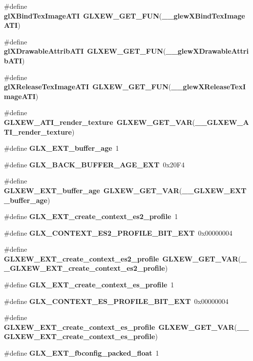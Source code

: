 \begin{DoxyCompactItemize}
\item 
\#define {\bf gl\+X\+Bind\+Tex\+Image\+A\+TI}~{\bf G\+L\+X\+E\+W\+\_\+\+G\+E\+T\+\_\+\+F\+UN}({\bf \+\_\+\+\_\+glew\+X\+Bind\+Tex\+Image\+A\+TI})
\item 
\#define {\bf gl\+X\+Drawable\+Attrib\+A\+TI}~{\bf G\+L\+X\+E\+W\+\_\+\+G\+E\+T\+\_\+\+F\+UN}({\bf \+\_\+\+\_\+glew\+X\+Drawable\+Attrib\+A\+TI})
\item 
\#define {\bf gl\+X\+Release\+Tex\+Image\+A\+TI}~{\bf G\+L\+X\+E\+W\+\_\+\+G\+E\+T\+\_\+\+F\+UN}({\bf \+\_\+\+\_\+glew\+X\+Release\+Tex\+Image\+A\+TI})
\item 
\#define {\bf G\+L\+X\+E\+W\+\_\+\+A\+T\+I\+\_\+render\+\_\+texture}~{\bf G\+L\+X\+E\+W\+\_\+\+G\+E\+T\+\_\+\+V\+AR}({\bf \+\_\+\+\_\+\+G\+L\+X\+E\+W\+\_\+\+A\+T\+I\+\_\+render\+\_\+texture})
\item 
\#define {\bf G\+L\+X\+\_\+\+E\+X\+T\+\_\+buffer\+\_\+age}~1
\item 
\#define {\bf G\+L\+X\+\_\+\+B\+A\+C\+K\+\_\+\+B\+U\+F\+F\+E\+R\+\_\+\+A\+G\+E\+\_\+\+E\+XT}~0x20\+F4
\item 
\#define {\bf G\+L\+X\+E\+W\+\_\+\+E\+X\+T\+\_\+buffer\+\_\+age}~{\bf G\+L\+X\+E\+W\+\_\+\+G\+E\+T\+\_\+\+V\+AR}({\bf \+\_\+\+\_\+\+G\+L\+X\+E\+W\+\_\+\+E\+X\+T\+\_\+buffer\+\_\+age})
\item 
\#define {\bf G\+L\+X\+\_\+\+E\+X\+T\+\_\+create\+\_\+context\+\_\+es2\+\_\+profile}~1
\item 
\#define {\bf G\+L\+X\+\_\+\+C\+O\+N\+T\+E\+X\+T\+\_\+\+E\+S2\+\_\+\+P\+R\+O\+F\+I\+L\+E\+\_\+\+B\+I\+T\+\_\+\+E\+XT}~0x00000004
\item 
\#define {\bf G\+L\+X\+E\+W\+\_\+\+E\+X\+T\+\_\+create\+\_\+context\+\_\+es2\+\_\+profile}~{\bf G\+L\+X\+E\+W\+\_\+\+G\+E\+T\+\_\+\+V\+AR}({\bf \+\_\+\+\_\+\+G\+L\+X\+E\+W\+\_\+\+E\+X\+T\+\_\+create\+\_\+context\+\_\+es2\+\_\+profile})
\item 
\#define {\bf G\+L\+X\+\_\+\+E\+X\+T\+\_\+create\+\_\+context\+\_\+es\+\_\+profile}~1
\item 
\#define {\bf G\+L\+X\+\_\+\+C\+O\+N\+T\+E\+X\+T\+\_\+\+E\+S\+\_\+\+P\+R\+O\+F\+I\+L\+E\+\_\+\+B\+I\+T\+\_\+\+E\+XT}~0x00000004
\item 
\#define {\bf G\+L\+X\+E\+W\+\_\+\+E\+X\+T\+\_\+create\+\_\+context\+\_\+es\+\_\+profile}~{\bf G\+L\+X\+E\+W\+\_\+\+G\+E\+T\+\_\+\+V\+AR}({\bf \+\_\+\+\_\+\+G\+L\+X\+E\+W\+\_\+\+E\+X\+T\+\_\+create\+\_\+context\+\_\+es\+\_\+profile})
\item 
\#define {\bf G\+L\+X\+\_\+\+E\+X\+T\+\_\+fbconfig\+\_\+packed\+\_\+float}~1

\end{DoxyCompactItemize}
